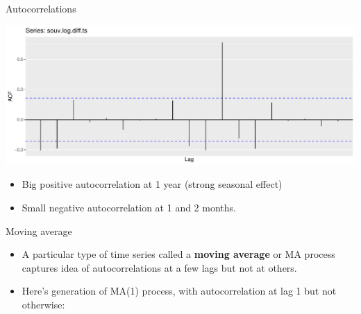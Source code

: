 \documentclass[
  ignorenonframetext,
]{beamer}
\newenvironment{Shaded}{\begin{snugshade}}{\end{snugshade}}
\newcommand{\DataTypeTok}[1]{\textcolor[rgb]{0.13,0.29,0.53}{#1}}
\newcommand{\DecValTok}[1]{\textcolor[rgb]{0.00,0.00,0.81}{#1}}
\newcommand{\KeywordTok}[1]{\textcolor[rgb]{0.13,0.29,0.53}{\textbf{#1}}}
\newcommand{\NormalTok}[1]{#1}
\newcommand{\OperatorTok}[1]{\textcolor[rgb]{0.81,0.36,0.00}{\textbf{#1}}}
\newcommand{\StringTok}[1]{\textcolor[rgb]{0.31,0.60,0.02}{#1}}
\providecommand{\tightlist}{%
  \setlength{\itemsep}{0pt}\setlength{\parskip}{0pt}}
\begin{document}
\begin{frame}[fragile]{Autocorrelations}
\protect\hypertarget{autocorrelations}{}

\begin{Shaded}
\end{Shaded}

\includegraphics{slides_d29_files/figure-beamer/unnamed-chunk-552-1.pdf}

\begin{itemize}
\tightlist
\item
  Big positive autocorrelation at 1 year (strong seasonal effect)
\item
  Small negative autocorrelation at 1 and 2 months.
\end{itemize}

\end{frame}

\begin{frame}[fragile]{Moving average}
\protect\hypertarget{moving-average}{}

\begin{itemize}
\item
  A particular type of time series called a \textbf{moving average} or
  MA process captures idea of autocorrelations at a few lags but not at
  others.
\item
  Here's generation of MA(1) process, with autocorrelation at lag 1 but
  not otherwise:
\end{itemize}

\begin{Shaded}
\end{Shaded}

\end{frame}
\end{document}
